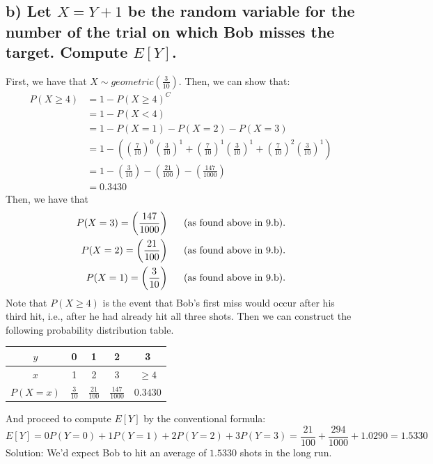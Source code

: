 \documentclass[11pt, letterpaper]{article}
\begin{document}
\subsection*{b) \normalfont Let $X=Y+1$ be the random variable for the number of the trial on which
Bob misses the target. Compute $E[Y]$.}
First, we have that $X\sim geometric(\frac{3}{10})$. Then, we can show that:
\begin{align*}
    P(X\geq 4)&=1-P(X\geq 4)^C\\
    &=1-P(X<4)\\
    &=1-P(X=1)-P(X=2)-P(X=3)\\
    &=1-\left(\left(\frac{7}{10}\right)^0\left(\frac{3}{10}\right)^1+\left(\frac{7}{10}\right)^1\left(\frac{3}{10}\right)^1+\left(\frac{7}{10}\right)^2\left(\frac{3}{10}\right)^1\right)\\
    &=1-\left(\frac{3}{10}\right)-\left(\frac{21}{100}\right)-\left(\frac{147}{1000}\right)\\
    &=0.3430
\end{align*}
\newpage
Then, we have that
\begin{align*}
    P(X=3)=\left(\frac{147}{1000}\right)\text{\indent (as found above in 9.b).}\\
    P(X=2)=\left(\frac{21}{100}\right)\text{\indent (as found above in 9.b).}\\
    P(X=1)=\left(\frac{3}{10}\right)\text{\indent (as found above in 9.b).}
\end{align*}
Note that $P(X\geq 4)$ is the event that Bob's first miss would occur after his third hit, i.e., after
he had already hit all three shots. Then we can construct the following probability distribution table.
\begin{table}[h!]
    \begin{center}
        \begin{tabular}{c|c|c|c|c}
            $y$ & 0 & 1 & 2 & 3\\
            \hline
            $x$ & 1 & 2 & 3 & $\geq4$\\
            \hline
            $P(X=x)$ & $\frac{3}{10}$ & $\frac{21}{100}$ & $\frac{147}{1000}$ & $0.3430$ 
        \end{tabular}
    \end{center}
\end{table}
And proceed to compute $E[Y]$ by the conventional formula:
\[E[Y]=0P(Y=0)+1P(Y=1)+2P(Y=2)+3P(Y=3)=\frac{21}{100}+\frac{294}{1000}+1.0290=1.5330\]
Solution: We'd expect Bob to hit an average of $1.5330$ shots in the long run. 
\end{document}
